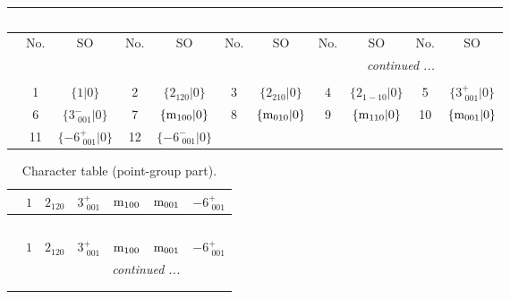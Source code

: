\documentclass[fleqn,10pt,landscape]{article}
\begin{document}
\begin{itemize}
\begin{center}
\begin{longtable}{c|cc|cc|cc|cc|cc}
\multicolumn{10}{l}{\tablename\ \thetable{}} \\
 \hline \hline
 & No. & SO & No. & SO & No. & SO & No. & SO & No. & SO \\ \hline \endhead

 \hline \hline
\multicolumn{10}{r}{\footnotesize\it continued ...} \\ \endfoot

 \hline \hline
\multicolumn{10}{r}{} \\ \endlastfoot

 & 1 & $\{1|0\}$ & 2 & $\{2{}_{120}|0\}$ & 3 & $\{2{}_{210}|0\}$ & 4 & $\{2{}_{1-10}|0\}$ & 5 & $\{3^{+}_{\,\,001}|0\}$ \\
& 6 & $\{3^{-}_{\,\,001}|0\}$ & 7 & $\{{\rm m}_{100}|0\}$ & 8 & $\{{\rm m}_{010}|0\}$ & 9 & $\{{\rm m}_{110}|0\}$ & 10 & $\{{\rm m}_{001}|0\}$ \\
& 11 & $\{-6^{+}_{\,\,001}|0\}$ & 12 & $\{-6^{-}_{\,\,001}|0\}$ &  &  &  &  &  &  \\
\end{longtable}
\end{center}
\begin{center}
\renewcommand{\arraystretch}{1.0}
\begin{longtable}{c|rrrrrr}
\caption{Character table (point-group part).}
 \\
 \hline \hline
 & $ 1 $ & $ 2{}_{120} $ & $ 3^{+}_{\,\,001} $ & $ {\rm m}_{100} $ & $ {\rm m}_{001} $ & $ -6^{+}_{\,\,001} $ \\ \hline \endfirsthead

\multicolumn{6}{l}{\tablename\ \thetable{}} \\
 \hline \hline
 & $ 1 $ & $ 2{}_{120} $ & $ 3^{+}_{\,\,001} $ & $ {\rm m}_{100} $ & $ {\rm m}_{001} $ & $ -6^{+}_{\,\,001} $ \\ \hline \endhead

 \hline \hline
\multicolumn{6}{r}{\footnotesize\it continued ...} \\ \endfoot

 \hline \hline
\multicolumn{6}{r}{} \\ \endlastfoot


\end{longtable}
\end{center}
\end{itemize}
\end{document}
